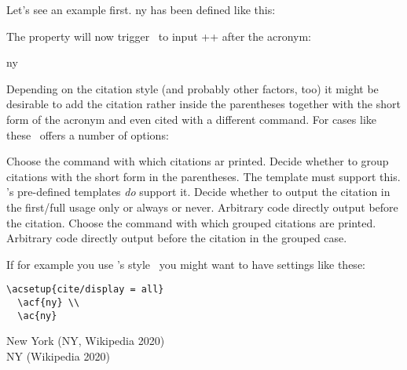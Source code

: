 \documentclass{acro-manual}
\begin{document}
Let's see an example first. \acs*{ny} has been defined like this:
\begin{sourcecode}
\end{sourcecode}
The property  will now trigger \acro\ to input
\verbcode+\cite{NewYork}+ after the acronym:
\begin{example}
  \ac{ny}
\end{example}
Depending on the citation style (and probably other factors, too) it might be
desirable to add the citation rather inside the parentheses together with the
short form of the acronym and even cited with a different command.  For cases
like these \acro\ offers a number of options:
\begin{options}
    Choose the command with which citations ar printed.
    Decide whether to group citations with the short form in the parentheses.
    The template must support this.  \acro's pre-defined templates \emph{do}
    support it.
    Decide whether to output the citation in the first/full usage only or
    always or never.
    Arbitrary code directly output before the citation.
    Choose the command with which grouped citations are printed.
  \Default{,\textvisiblespace}
    Arbitrary code directly output before the citation in the grouped case.
\end{options}

If for example you use 's 
style~\cite{pkg:biblatex} you might want to have settings like these:
\begin{sourcecode}
\end{sourcecode}
\begin{cnltxcode}
\begin{lstlisting}[style=cnltx]
  \acsetup{cite/display = all}
  \acf{ny} \\
  \ac{ny}
\end{lstlisting}
\tcblower
  New York (NY, Wikipedia 2020) \\
  NY (Wikipedia 2020)
\end{cnltxcode}
\end{document}
